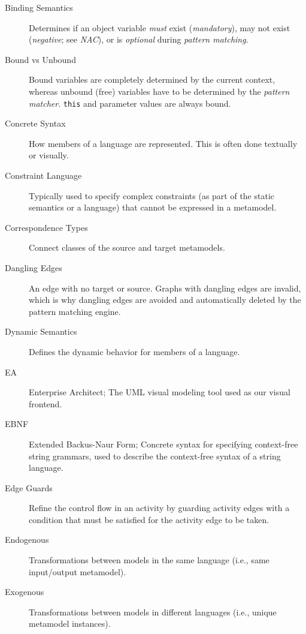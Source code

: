 \begin{description}
\item[Binding Semantics] %
Determines if an object variable \emph{must} exist (\emph{mandatory}), may not exist (\emph{negative}; see \emph{NAC}), or is \emph{optional} during
\emph{pattern matching}.

\item[Bound vs Unbound] %
Bound variables are completely determined by the current context, whereas unbound (free) variables have to be determined by the \emph{pattern matcher}.
\texttt{this} and parameter values are always bound.

\item[Concrete Syntax] %
How members of a language are represented. This is often done textually or visually.

\item[Constraint Language] %
Typically used to specify complex constraints (as part of the static semantics or a language) that cannot be expressed in a metamodel.

\item[Correspondence Types] %
Connect classes of the source and target metamodels.

\item[Dangling Edges] %
An edge with no target or source. Graphs with dangling edges are invalid, which is why dangling edges are avoided and automatically deleted by the pattern
matching engine.

\item[Dynamic Semantics] %
Defines the dynamic behavior for members of a language.

\item[EA] %
Enterprise Architect; The UML visual modeling tool used as our visual frontend.

\item[EBNF] %
Extended Backus-Naur Form; Concrete syntax for specifying con\-text-free string grammars, used to describe the context-free syntax of a string
language.

\item[Edge Guards] %
Refine the control flow in an activity by guarding activity edges with a condition that must be satisfied for the activity edge to be taken.

\item[Endogenous] %
Transformations between models in the same language (i.e., same input/output metamodel). 
 
\item[Exogenous] %
Transformations between models in different languages (i.e., unique metamodel instances). 


\end{description}
